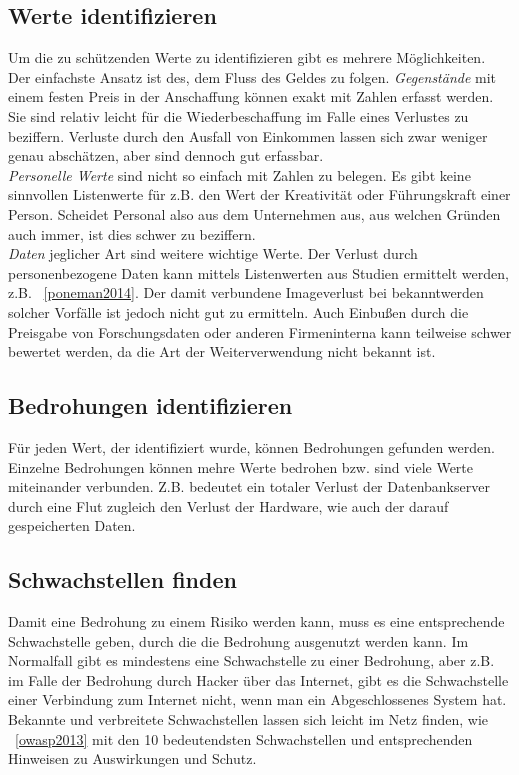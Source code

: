 \subsection{Werte identifizieren}
Um die zu schützenden Werte zu identifizieren gibt es mehrere Möglichkeiten. Der einfachste Ansatz ist des, dem Fluss des Geldes zu folgen. \textit{Gegenstände} mit einem festen Preis in der Anschaffung können exakt mit Zahlen erfasst werden. Sie sind relativ leicht für die Wiederbeschaffung im Falle eines Verlustes zu beziffern. Verluste durch den Ausfall von Einkommen lassen sich zwar weniger genau abschätzen, aber sind dennoch gut erfassbar.\\
\textit{Personelle Werte} sind nicht so einfach mit Zahlen zu belegen. Es gibt keine sinnvollen Listenwerte für z.B. den Wert der Kreativität oder Führungskraft einer Person. Scheidet Personal also aus dem Unternehmen aus, aus welchen Gründen auch immer, ist dies schwer zu beziffern.\\
\textit{Daten} jeglicher Art sind weitere wichtige Werte. Der Verlust durch personenbezogene Daten kann mittels Listenwerten aus Studien ermittelt werden, z.B. ~\ref{poneman2014}. Der damit verbundene Imageverlust bei bekanntwerden solcher Vorfälle ist jedoch nicht gut zu ermitteln. Auch Einbußen durch die Preisgabe von Forschungsdaten oder anderen Firmeninterna kann teilweise schwer bewertet werden, da die Art der Weiterverwendung nicht bekannt ist.

\subsection{Bedrohungen identifizieren}
Für jeden Wert, der identifiziert wurde, können Bedrohungen gefunden werden. Einzelne Bedrohungen können mehre Werte bedrohen bzw. sind viele Werte miteinander verbunden. Z.B. bedeutet ein totaler Verlust der Datenbankserver durch eine Flut  zugleich den Verlust der Hardware, wie auch der darauf gespeicherten Daten.

\subsection{Schwachstellen finden}
Damit eine Bedrohung zu einem Risiko werden kann, muss es eine entsprechende Schwachstelle geben, durch die die Bedrohung ausgenutzt werden kann. Im Normalfall gibt es mindestens eine Schwachstelle zu einer Bedrohung, aber z.B. im Falle der Bedrohung durch Hacker über das Internet, gibt es die Schwachstelle einer Verbindung zum Internet nicht, wenn man ein Abgeschlossenes System hat. Bekannte und verbreitete Schwachstellen lassen sich leicht im Netz finden, wie ~\ref{owasp2013} mit den 10 bedeutendsten Schwachstellen und entsprechenden Hinweisen zu Auswirkungen und Schutz.
